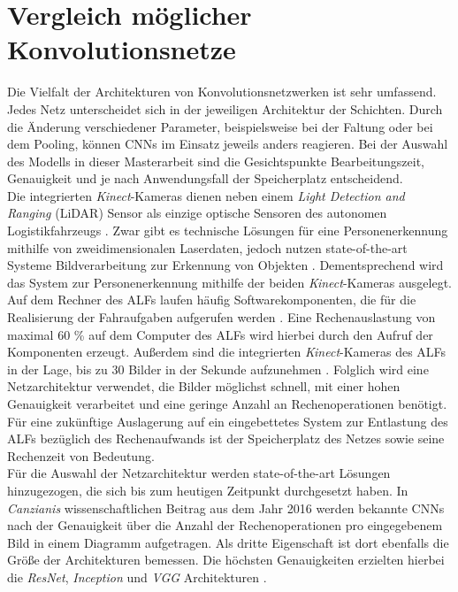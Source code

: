 		\section{Vergleich möglicher Konvolutionsnetze}
		\label{sec: cnns}
		Die Vielfalt der Architekturen von Konvolutionsnetzwerken ist sehr umfassend. Jedes Netz unterscheidet sich in der jeweiligen Architektur der Schichten. Durch die Änderung verschiedener Parameter, beispielsweise bei der Faltung oder bei dem Pooling, können CNNs im Einsatz jeweils anders reagieren. Bei der Auswahl des Modells in dieser Masterarbeit sind die Gesichtspunkte Bearbeitungszeit, Genauigkeit und je nach Anwendungsfall der Speicherplatz entscheidend.\\
		
		Die integrierten \textit{Kinect}-Kameras dienen neben einem \textit{Light Detection and Ranging} (LiDAR) Sensor als einzige optische Sensoren des autonomen Logistikfahrzeugs \cite{alf}. Zwar gibt es technische Lösungen für eine Personenerkennung mithilfe von zweidimensionalen Laserdaten, jedoch nutzen state-of-the-art Systeme Bildverarbeitung zur Erkennung von Objekten \cite{mobilenets, hogsvm}. Dementsprechend wird das System zur Personenerkennung mithilfe der beiden \textit{Kinect}-Kameras ausgelegt.\\
		
		Auf dem Rechner des ALFs laufen häufig Softwarekomponenten, die für die Realisierung der Fahraufgaben aufgerufen werden \cite{Bachelorarbeit}. Eine Rechenauslastung von maximal 60 \% auf dem Computer des ALFs wird hierbei durch den Aufruf der Komponenten erzeugt. Außerdem sind die integrierten \textit{Kinect}-Kameras des ALFs in der Lage, bis zu 30 Bilder in der Sekunde aufzunehmen \cite{alf}. Folglich wird eine Netzarchitektur verwendet, die Bilder möglichst schnell, mit einer hohen Genauigkeit verarbeitet und eine geringe Anzahl an Rechenoperationen benötigt. Für eine zukünftige Auslagerung auf ein eingebettetes System zur Entlastung des ALFs bezüglich des Rechenaufwands ist der Speicherplatz des Netzes sowie seine Rechenzeit von Bedeutung.\\
		\newpage
		Für die Auswahl der Netzarchitektur werden state-of-the-art Lösungen hinzugezogen, die sich bis zum heutigen Zeitpunkt durchgesetzt haben. In \textit{Canzianis} wissenschaftlichen Beitrag \cite{cnnvergleich} aus dem Jahr 2016 werden bekannte CNNs nach der Genauigkeit über die Anzahl der Rechenoperationen pro eingegebenem Bild in einem Diagramm aufgetragen. Als dritte Eigenschaft ist dort ebenfalls die Größe der Architekturen bemessen. Die höchsten Genauigkeiten erzielten hierbei die \textit{ResNet}, \textit{Inception} und \textit{VGG} Architekturen \cite{cnnvergleich}.\\
		

